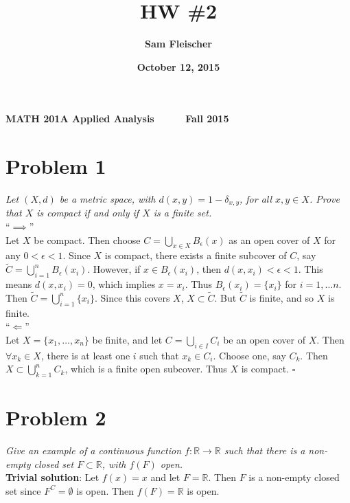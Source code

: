 \documentclass[12pt]{article}
\title{\bf HW \#2}
\author{\bf Sam Fleischer}
\date{\bf October 12, 2015}
\begin{document}
{\bf MATH 201A \hfill Applied Analysis \ \ \ \ \ \hfill Fall 2015} 

{\let\newpage\relax\maketitle}

\section*{Problem 1}
{\it Let $(X,d)$ be a metric space, with $d(x, y) = 1 - \delta_{x,y}$, for all $x,y \in X$.  Prove that $X$ is compact if and only if $X$ is a finite set.} \\

\noindent ``$\implies$'' \\

Let $X$ be compact.  Then choose $C = \bigcup_{x\in X}B_{\epsilon}(x)$ as an open cover of $X$ for any $0 < \epsilon < 1$.  Since $X$ is compact, there exists a finite subcover of $C$, say $\tilde{C} = \bigcup_{i = 1}^{n}B_{\epsilon}(x_i)$.  However, if $x \in B_{\epsilon}(x_i)$, then $d(x, x_i) < \epsilon < 1$.  This means $d(x, x_i) = 0$, which implies $x = x_i$.  Thus $B_{\epsilon}(x_i) = \{x_i\}$ for $i = 1, \dots n$.  Then $\tilde{C} = \bigcup_{i = 1}^{n}\{x_i\}$.  Since this covers $X$, $X \subset \tilde{C}$.  But $\tilde{C}$ is finite, and so $X$ is finite. \\

\noindent ``$\Longleftarrow$'' \\

Let $X = \{x_1, \dots, x_n\}$ be finite, and let $C = \bigcup_{i\in I}C_i$ be an open cover of $X$.  Then $\forall x_k \in X$, there is at least one $i$ such that $x_k \in C_i$.  Choose one, say $C_k$.  Then $X \subset \bigcup_{k=1}^{n}C_k$, which is a finite open subcover.  Thus $X$ is compact. \hfill $\square$

\section*{Problem 2}
{\it Give an example of a continuous function $f : \mathbb{R} \rightarrow \mathbb{R}$ such that there is a non-empty closed set $F \subset \mathbb{R}$, with $f(F)$ open.} \\

\noindent\textbf{Trivial solution}: Let $f(x) = x$ and let $F = \mathbb{R}$.  Then $F$ is a non-empty closed set since $F^C = \emptyset$ is open.  Then $f(F) = \mathbb{R}$ is open.
\end{document}
